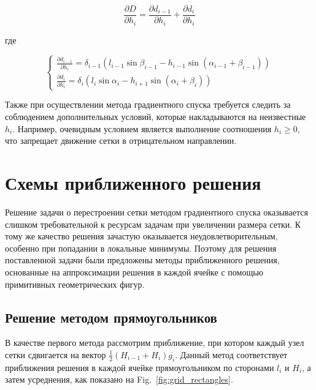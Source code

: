 \documentclass[
11pt,%
tightenlines,%
twoside,%
onecolumn,%
nofloats,%
nobibnotes,%
nofootinbib,%
superscriptaddress,%
noshowpacs,%
centertags]%
{revtex4}
\begin{document}
\begin{equation}
\frac{\partial D}{\partial h_i} = \frac{\partial d_{i - 1}}{\partial h_i} + \frac{\partial d_i}{\partial h_i}
\end{equation}

где

\begin{equation}
\begin{cases}
\frac{\partial d_{i - 1}}{\partial h_i} = \delta_{i - 1}(l_{i - 1} \sin \beta_{i - 1} - h_{i - 1} \sin(\alpha_{i - 1} + \beta_{i - 1})) \\
\frac{\partial d_i}{\partial h_i} = \delta_i(l_i \sin \alpha_i - h_{i + 1} \sin(\alpha_i + \beta_i))
\end{cases}
\end{equation}

Также при осуществлении метода градиентного спуска требуется следить за соблюдением дополнительных условий, которые накладываются на неизвестные $h_i$.
Например, очевидным условием является выполнение соотношения $h_i \ge 0$, что запрещает движение сетки в отрицательном направлении.

\section{Схемы приближенного решения}

Решение задачи о перестроении сетки методом градиентного спуска оказывается слишком требовательной к ресурсам задачам при увеличении размера сетки.
К тому же качество решения зачастую оказывается неудовлетворительным, особенно при попадании в локальные минимумы.
Поэтому для решения поставленной задачи были предложены методы приближенного решения, основанные на аппроксимации решения в каждой ячейке с помощью примитивных геометрических фигур.

\subsection{Решение методом прямоугольников}

В качестве первого метода рассмотрим приближение, при котором каждый узел сетки сдвигается на вектор $\frac{1}{2}(H_{i - 1} + H_i)\overline{g_i}$.
Данный метод соответствует приближения решения в каждой ячейке прямоугольником по сторонами $l_i$ и $H_i$, а затем усреднения, как показано на Fig.~\ref{fig:grid_rectangles}.
\end{document}
